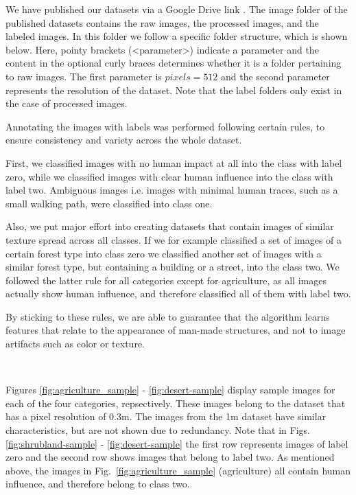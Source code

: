 We have published our datasets via a Google Drive link \parencite{datasets}. The image folder of the published datasets contains the raw images, the processed images, and the labeled images. In this folder we follow a specific folder structure, which is shown below. Here, pointy brackets (<parameter>) indicate a parameter and the content in the optional curly braces determines whether it is a folder pertaining to raw images. The first parameter is $pixels = 512$ and the second parameter represents the resolution of the dataset. Note that the label folders only exist in the case of processed images.
\vspace{10px}
\vspace{10px}

Annotating the images with labels was performed following certain rules, to ensure consistency and variety across the whole dataset.

First, we classified images with no human impact at all into the class with label zero, while we classified images with clear human influence into the class with label two. Ambiguous images i.e. images with minimal human traces, such as a small walking path, were classified into class one.

Also, we put major effort into creating datasets that contain images of similar texture spread across all classes. If we for example classified a set of images of a certain forest type into class zero we classified another set of images with a similar forest type, but containing a building or a street, into the class two. We followed the latter rule for all categories except for agriculture, as all images actually show human influence, and therefore classified all of them with label two. 

By sticking to these rules, we are able to guarantee that the algorithm learns features that relate to the appearance of man-made structures, and not to image artifacts such as color or texture.

\

Figures \ref{fig:agriculture_sample} - \ref{fig:desert-sample} display sample images for each of the four categories, repsectively. These images belong to the dataset that has a pixel resolution of 0.3m. The images from the 1m dataset have similar characteristics, but are not shown due to redundancy. Note that in Figs. \ref{fig:shrubland-sample} - \ref{fig:desert-sample} the first row represents images of label zero and the second row shows images that belong to label two. As mentioned above, the images in Fig.~\ref{fig:agriculture_sample} (agriculture) all contain human influence, and therefore belong to class two. 

